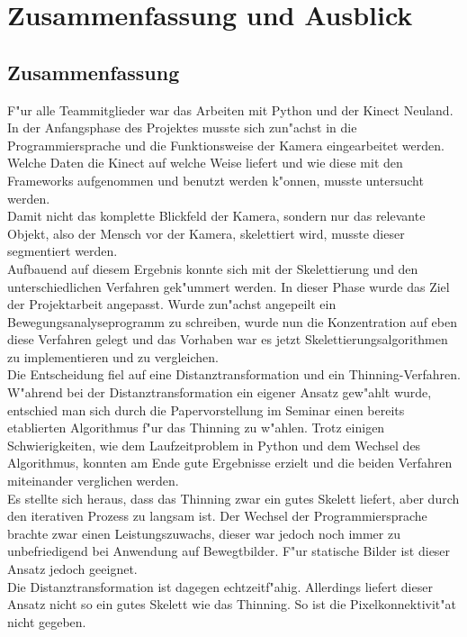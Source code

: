 \chapter{Zusammenfassung und Ausblick}
\label{ch:ausblick}
\section{Zusammenfassung}
F"ur alle Teammitglieder war das Arbeiten mit Python und der Kinect Neuland. In der Anfangsphase des Projektes musste sich zun"achst in die Programmiersprache und die Funktionsweise der Kamera eingearbeitet werden. Welche Daten die Kinect auf welche Weise liefert und wie diese mit den Frameworks aufgenommen und benutzt werden k"onnen, musste untersucht werden.\\
Damit nicht das komplette Blickfeld der Kamera, sondern nur das relevante Objekt, also der Mensch vor der Kamera, skelettiert wird, musste dieser segmentiert werden.\\Aufbauend auf diesem Ergebnis konnte sich mit der Skelettierung und den unterschiedlichen Verfahren gek"ummert werden. In dieser Phase wurde das Ziel der Projektarbeit angepasst. Wurde zun"achst angepeilt ein Bewegungsanalyseprogramm zu schreiben, wurde nun die Konzentration auf eben diese Verfahren gelegt und das Vorhaben war es jetzt Skelettierungsalgorithmen zu implementieren und zu vergleichen.\\Die Entscheidung fiel auf eine Distanztransformation und ein Thinning-Verfahren. W"ahrend bei der Distanztransformation ein eigener Ansatz gew"ahlt wurde, entschied man sich durch die Papervorstellung im Seminar einen bereits etablierten Algorithmus f"ur das Thinning zu w"ahlen. Trotz einigen Schwierigkeiten, wie dem Laufzeitproblem in Python und dem Wechsel des Algorithmus, konnten am Ende gute Ergebnisse erzielt und die beiden Verfahren miteinander verglichen werden. \\
Es stellte sich heraus, dass das Thinning zwar ein gutes Skelett liefert, aber durch den iterativen Prozess zu langsam ist. Der Wechsel der Programmiersprache brachte zwar einen Leistungszuwachs, dieser war jedoch noch immer zu unbefriedigend bei Anwendung auf Bewegtbilder. F"ur statische Bilder ist dieser Ansatz jedoch geeignet. \\ Die Distanztransformation ist dagegen echtzeitf"ahig. Allerdings liefert dieser Ansatz nicht so ein gutes Skelett wie das Thinning. So ist die Pixelkonnektivit"at nicht gegeben. 
